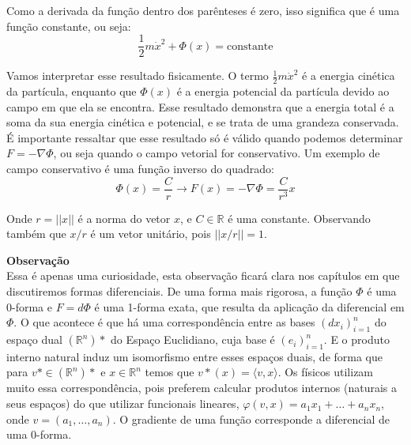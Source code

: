 Como a derivada da função dentro dos parênteses é zero, isso 
significa que é uma função constante, ou seja:
%
\[
\frac{1}{2}m\dot{x}^2 + \Phi(x) = \text{constante} 
\]

Vamos interpretar esse resultado fisicamente. O termo 
$\frac{1}{2}m\dot{x}^2$ é a energia cinética da partícula, 
enquanto que $\Phi(x)$ é a energia potencial da partícula 
devido ao campo em que ela se encontra. Esse resultado demonstra 
que a energia total é a soma da sua energia cinética e potencial, 
e se trata de uma grandeza conservada. É importante ressaltar que 
esse resultado só é válido quando podemos determinar 
$F = - \nabla\Phi$, ou seja quando o campo vetorial for 
conservativo. Um exemplo de campo conservativo é uma função 
inverso do quadrado:
%
\[
\Phi(x) = \frac{C}{r} \to F(x) 
= - \nabla\Phi = \frac{C}{r^3}x
\]

Onde $r = ||x||$ é a norma do vetor $x$, e $C\in\mathbb{R}$ 
é uma constante. Observando também que $x/r$ é um vetor unitário, 
pois $||x/r|| = 1$. 


\vspace{0.2cm}
\noindent \textbf{Observação}
\\
Essa é apenas uma curiosidade, esta observação ficará
clara nos capítulos em que discutiremos formas diferenciais.
De uma forma mais rigorosa, a função $\Phi$ é uma 0-forma e 
$F = d\Phi$ é uma 1-forma exata, que resulta da 
aplicação da diferencial em $\Phi$. O que acontece é que há uma 
correspondência entre as bases $(dx_i)_{i=1}^{n}$ do espaço dual 
$(\mathbb{R}^n)*$ do Espaço Euclidiano, cuja base é $(e_i)_{i=1}^{n}$. 
E o produto interno natural induz um isomorfismo entre esses espaços 
duais, de forma que para $v*\in (\mathbb{R}^n)*$ e $x\in\mathbb{R}^n$ 
temos que $v*(x) = \langle v,x\rangle$. Os físicos utilizam muito 
essa correspondência, pois preferem calcular produtos internos 
(naturais a seus espaços) do que utilizar funcionais lineares, 
$\varphi(v,x) = a_1x_1 + \ldots + a_nx_n$, onde $v = (a_1,\ldots,a_n)$. 
O gradiente de uma função corresponde a diferencial de uma 0-forma.
